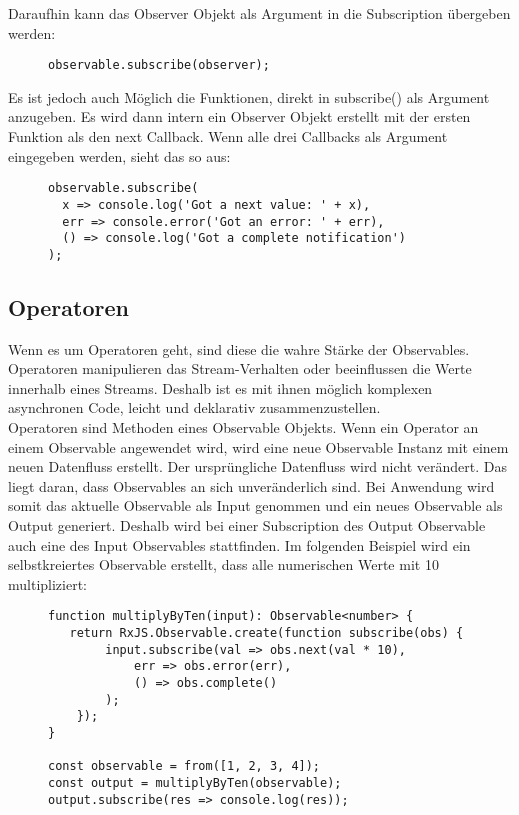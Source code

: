 \noindent
Daraufhin kann das Observer Objekt als Argument in die Subscription übergeben werden:

\begin{figure}[H]
\begin{lstlisting}[basicstyle=\small]
observable.subscribe(observer);
\end{lstlisting}
\end{figure}

\noindent
Es ist jedoch auch Möglich die Funktionen, direkt in subscribe() als Argument anzugeben. Es wird dann intern ein Observer Objekt erstellt mit der ersten Funktion als den next Callback. Wenn alle drei Callbacks als Argument eingegeben werden, sieht das so aus:

\begin{figure}[H]
\begin{lstlisting}[basicstyle=\small]
observable.subscribe(
  x => console.log('Got a next value: ' + x),
  err => console.error('Got an error: ' + err),
  () => console.log('Got a complete notification')
);
\end{lstlisting}
\end{figure}

\subsection{Operatoren}
Wenn es um Operatoren geht, sind diese die wahre Stärke der Observables. Operatoren manipulieren das Stream-Verhalten oder beeinflussen die Werte innerhalb eines Streams. Deshalb ist es mit ihnen möglich komplexen asynchronen Code, leicht und deklarativ zusammenzustellen.\\

\noindent
Operatoren sind Methoden eines Observable Objekts. Wenn ein Operator an einem Observable angewendet wird, wird eine neue Observable Instanz mit einem neuen Datenfluss erstellt. Der ursprüngliche Datenfluss wird nicht verändert. Das liegt daran, dass Observables an sich unveränderlich sind. Bei Anwendung wird somit das aktuelle Observable als Input genommen und ein neues Observable als Output generiert. Deshalb wird bei einer Subscription des Output Observable auch eine des Input Observables stattfinden. Im folgenden Beispiel wird ein selbstkreiertes Observable erstellt, dass alle numerischen Werte mit 10 multipliziert:

\begin{figure}[H]
\begin{lstlisting}[basicstyle=\small]
function multiplyByTen(input): Observable<number> {
   return RxJS.Observable.create(function subscribe(obs) {
        input.subscribe(val => obs.next(val * 10),
            err => obs.error(err),
            () => obs.complete()
        );
    });
}

const observable = from([1, 2, 3, 4]);
const output = multiplyByTen(observable);
output.subscribe(res => console.log(res));
\end{lstlisting}
\end{figure}

